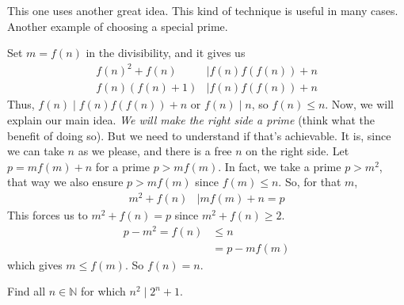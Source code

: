 \begin{solution}[Second]
	This one uses another great idea. This kind of technique is useful in many cases. Another example of choosing a special prime.

	Set $m=f(n)$ in the divisibility, and it gives us
	\begin{align*}
	f(n)^2+f(n) & \mid f(n)f(f(n))+n\\
	f(n)(f(n)+1)& \mid  f(n)f(f(n))+n
	\end{align*}
	Thus, $f(n)\mid f(n)f(f(n))+n$ or $f(n)\mid n$, so $f(n)\leq n$. Now, we will explain our main idea. \textit{We will make the right side a prime} (think what the benefit of doing so). But we need to understand if that's achievable. It is, since we can take $n$ as we please, and there is a free $n$ on the right side. Let $p=mf(m)+n$ for a prime $p>mf(m)$. In fact, we take a prime $p>m^2$, that way we also ensure $p>mf(m)$ since $f(m)\leq n$. So, for that $m$,
		\begin{align*}
			m^2+f(n) & \mid mf(m)+n=p
		\end{align*}
	This forces us to $m^2+f(n)=p$ since $m^2+f(n)\geq2$.
		\begin{align*}
			p-m^2 = f(n) & \leq n\\
					 & = p-mf(m)
		\end{align*}
	which gives $m\leq f(m)$. So $f(n)=n$.
\end{solution}

\begin{problem}
	Find all $n\in\mathbb{N}$ for which $n^2\mid 2^n+1$.
\end{problem}


